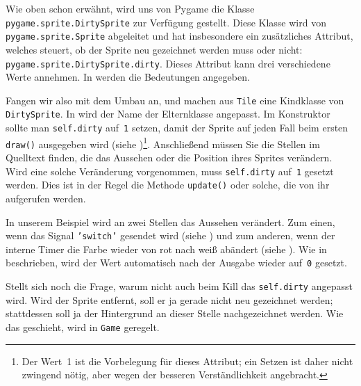 
Wie oben schon erwähnt, wird uns von Pygame die Klasse \texttt{pygame\-.sprite\-.Dirty\-Sprite} zur Verfügung gestellt. Diese Klasse wird von \texttt{pygame\-.sprite\-.Sprite} abgeleitet und hat insbesondere ein zusätzliches Attribut, welches steuert, ob der Sprite neu gezeichnet werden muss oder nicht: \texttt{pygame.sprite.DirtySprite.dirty}. Dieses Attribut kann drei verschiedene Werte annehmen. In  werden die Bedeutungen angegeben. 


Fangen wir also mit dem Umbau an, und machen aus \texttt{Tile} eine Kindklasse von \texttt{Dirty\-Sprite}. In  wird der Name der Elternklasse angepasst. Im Konstruktor sollte man \texttt{self.dirty} auf~\texttt{1} setzen, damit der Sprite auf jeden Fall beim ersten \texttt{draw()} ausgegeben wird (siehe )\footnote{Der Wert~1 ist die Vorbelegung für dieses Attribut; ein Setzen ist daher nicht zwingend nötig, aber wegen der besseren Verständlichkeit angebracht.}. Anschließend müssen Sie die Stellen im Quelltext finden, die das Aussehen oder die Position ihres Sprites verändern. Wird eine solche Veränderung vorgenommen, muss \texttt{self.dirty} auf~\texttt{1} gesetzt werden. Dies ist in der Regel die Methode \texttt{update()} oder solche, die von ihr aufgerufen werden. 

In unserem Beispiel wird an zwei Stellen das Aussehen verändert. Zum einen, wenn das Signal \texttt{'switch'} gesendet wird (siehe ) und zum anderen, wenn der interne Timer die Farbe wieder von rot nach weiß abändert (siehe ). Wie in  beschrieben, wird der Wert automatisch nach der Ausgabe wieder auf~\texttt{0} gesetzt.

Stellt sich noch die Frage, warum nicht auch beim Kill das \texttt{self.dirty} angepasst wird. Wird der Sprite entfernt, soll er ja gerade nicht neu gezeichnet werden; stattdessen soll ja der Hintergrund an dieser Stelle nachgezeichnet werden. Wie das geschieht, wird in \texttt{Game} geregelt.


